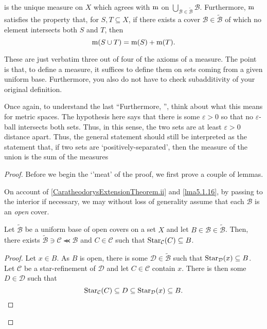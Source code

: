 \begin{thm}
\begin{savenotes}
\begin{equation}
\begin{multlined}
\end{multlined}
\end{equation}
is the unique measure on $X$ which agrees with $\mathrm{m}$ on $\bigcup _{\mathcal{B}\in \widetilde{\mathcal{B}}}\mathcal{B}$.  Furthermore, $\mathrm{m}$ satisfies the property that, for $S,T\subseteq X$, if there exists a cover $\mathcal{B}\in \widetilde{\mathcal{B}}$ of which no element intersects both $S$ and $T$, then
\begin{equation}
\mathrm{m} (S\cup T)=\mathrm{m} (S)+\mathrm{m} (T).
\end{equation}
\begin{rmk}
These are just verbatim three out of four of the axioms of a measure.  The point is that, to define a measure, it suffices to define them on sets coming from a given uniform base.  Furthermore, you also do not have to check subadditivity of your original definition.
\end{rmk}
\begin{rmk}
Once again, to understand the last ``Furthermore, \textellipsis'', think about what this means for metric spaces.  The hypothesis here says that there is some $\varepsilon >0$ so that no $\varepsilon$-ball intersects both sets.  Thus, in this sense, the two sets are at least $\varepsilon >0$ distance apart.  Thus, the general statement should still be interpreted as the statement that, if two sets are `positively-separated', then the measure of the union is the sum of the measures
\end{rmk}
\begin{proof}
Before we begin the `'meat' of the proof, we first prove a couple of lemmas.

On account of \ref{CaratheodorysExtensionTheorem.ii} and \cref{lma5.1.16}, by passing to the interior if necessary, we may without loss of generality assume that each $\mathcal{B}$ is an \emph{open} cover.
\begin{lma}
Let $\widetilde{\mathcal{B}}$ be a uniform base of open covers on a set $X$ and let $B\in \mathcal{B}\in \widetilde{\mathcal{B}}$.  Then, there exists $\widetilde{\mathcal{B}}\ni \mathcal{C}\llcurly \mathcal{B}$ and $C\in \mathcal{C}$ such that $\operatorname{Star} _{\mathcal{C}}(C)\subseteq B$.
\begin{proof}
Let $x\in B$.  As $B$ is open, there is some $\mathcal{D}\in \widetilde{\mathcal{B}}$ such that $\operatorname{Star} _{\mathcal{D}}(x)\subseteq B$.  Let $\mathcal{C}$ be a star-refinement of $\mathcal{D}$ and let $C\in \mathcal{C}$ contain $x$.  There is then some $D\in \mathcal{D}$ such that
\begin{equation}
\operatorname{Star} _{\mathcal{C}}(C)\subseteq D\subseteq \operatorname{Star} _{\mathcal{D}}(x)\subseteq B.
\end{equation}
\end{proof}
\end{lma}


\end{proof}
\end{savenotes}
\end{thm}
